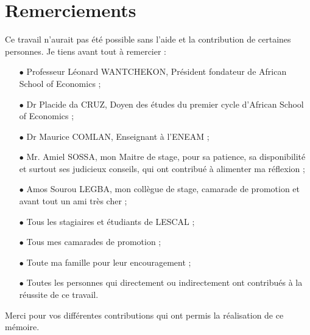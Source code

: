 \chapter*{Remerciements}

		\normalsize
		Ce travail n'aurait pas été possible sans l'aide et la contribution de 
		certaines personnes. Je tiens avant tout à remercier :
		\begin{itemize}
		
			\item[$\bullet$] Professeur Léonard WANTCHEKON, Président fondateur de African School of Economics ;\\
			\item[$\bullet$] Dr Placide da CRUZ, Doyen des études du premier cycle d’African School of Economics ;\\
			\item[$\bullet$] Dr Maurice COMLAN, Enseignant à l’ENEAM ;\\
			\item[$\bullet$] Mr. Amiel SOSSA, mon Maitre de stage, pour sa patience, sa disponibilité et surtout ses judicieux conseils, qui ont contribué à alimenter ma réflexion ;\\
			\item[$\bullet$] Amos Sourou LEGBA, mon collègue de stage, camarade de promotion et avant tout un ami très cher ; \\
			\item[$\bullet$] Tous les stagiaires et étudiants de LESCAL ; \\
			\item[$\bullet$] Tous mes camarades de promotion ; \\
			\item[$\bullet$] Toute ma famille pour leur encouragement ; \\
			\item[$\bullet$] Toutes les personnes qui directement ou indirectement ont contribués à la réussite de ce travail. \\
		
		\end{itemize}
		Merci pour vos différentes contributions qui ont permis la 
		réalisation de ce mémoire.